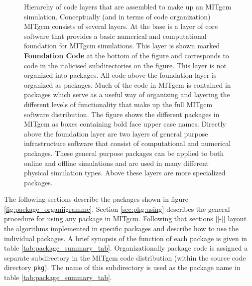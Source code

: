 \begin{figure}
\begin{minipage}{12cm}
\marginsize{0cm}{0cm}{0cm}{0cm}
\end{minipage}
\label{fig:package_organigramme}
\caption{ Hierarchy of code layers that are assembled to make up an MITgcm 
simulation. Conceptually (and in terms of code organization) MITgcm consists
of several layers. At the base is a layer of core software that provides a 
basic numerical and computational foundation for MITgcm simulations. This 
layer is shown marked {\bf Foundation Code} at the bottom of the figure
and corresponds to code in the italicised subdirectories on the figure.
This layer is not organized into packages. All code above the foundation layer
is organized as packages.  Much of the code in MITgcm is contained in packages 
which serve as a useful way of organizing and layering the different levels of 
functionality that make up the full MITgcm software distribution.
The figure shows the different packages in MITgcm as boxes containing bold 
face upper case names.  Directly above the foundation layer are two layers of 
general purpose infrastructure software that consist of computational and 
numerical packages.  These general purpose packages can be applied to both 
online and offline simulations and are used in many different physical 
simulation types.  Above these layers are more specialized packages.  }
\end{figure}

The following sections describe the packages shown in 
figure \ref{fig:package_organiigramme}. Section \ref{sec:pkg:using}
describes the general procedure for using any package in MITgcm.
Following that sections \ref{}-\ref{} 
layout the algorithms implemented in specific packages
and describe how to use the individual packages. A brief synopsis of the 
function of each package is given in table \ref{tab:package_summary_tab}.
Organizationally package code is assigned a
separate subdirectory in the MITgcm code distribution
(within the source code directory \texttt{pkg}).
The name of this subdirectory is used as the package name in
table \ref{tab:package_summary_tab}.


